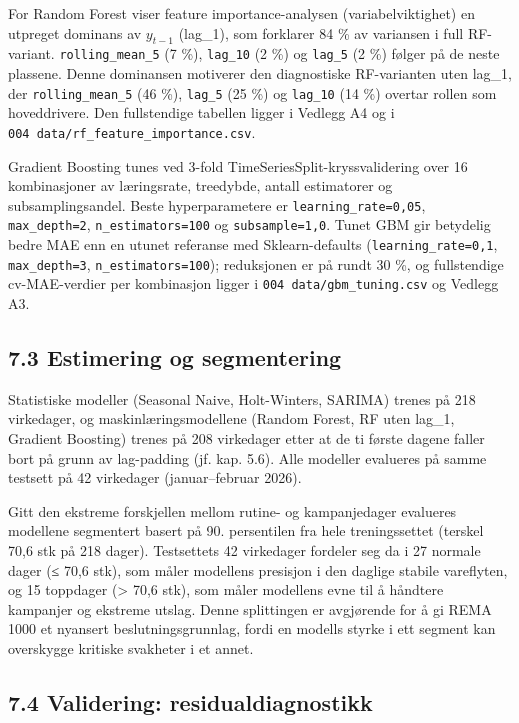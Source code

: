 \documentclass[
  norsk,
  11pt,
  a4paper,
]{article}
\begin{document}
For Random Forest viser feature importance-analysen (variabelviktighet)
en utpreget dominans av \(y_{t-1}\) (lag\_1), som forklarer 84 \% av
variansen i full RF-variant. \texttt{rolling\_mean\_5} (7 \%),
\texttt{lag\_10} (2 \%) og \texttt{lag\_5} (2 \%) følger på de neste
plassene. Denne dominansen motiverer den diagnostiske RF-varianten uten
lag\_1, der \texttt{rolling\_mean\_5} (46 \%), \texttt{lag\_5} (25 \%)
og \texttt{lag\_10} (14 \%) overtar rollen som hoveddrivere. Den
fullstendige tabellen ligger i Vedlegg A4 og i
\texttt{004\ data/rf\_feature\_importance.csv}.

Gradient Boosting tunes ved 3-fold TimeSeriesSplit-kryssvalidering over
16 kombinasjoner av læringsrate, treedybde, antall estimatorer og
subsamplingsandel. Beste hyperparametere er
\texttt{learning\_rate=0,05}, \texttt{max\_depth=2},
\texttt{n\_estimators=100} og \texttt{subsample=1,0}. Tunet GBM gir
betydelig bedre MAE enn en utunet referanse med Sklearn-defaults
(\texttt{learning\_rate=0,1}, \texttt{max\_depth=3},
\texttt{n\_estimators=100}); reduksjonen er på rundt 30 \%, og
fullstendige cv-MAE-verdier per kombinasjon ligger i
\texttt{004\ data/gbm\_tuning.csv} og Vedlegg A3.

\subsection{7.3 Estimering og
segmentering}\label{estimering-og-segmentering}

Statistiske modeller (Seasonal Naive, Holt-Winters, SARIMA) trenes på
218 virkedager, og maskinlæringsmodellene (Random Forest, RF uten
lag\_1, Gradient Boosting) trenes på 208 virkedager etter at de ti
første dagene faller bort på grunn av lag-padding (jf. kap. 5.6). Alle
modeller evalueres på samme testsett på 42 virkedager (januar--februar
2026).

Gitt den ekstreme forskjellen mellom rutine- og kampanjedager evalueres
modellene segmentert basert på 90. persentilen fra hele treningssettet
(terskel 70,6 stk på 218 dager). Testsettets 42 virkedager fordeler seg
da i 27 normale dager (≤ 70,6 stk), som måler modellens presisjon i den
daglige stabile vareflyten, og 15 toppdager (\textgreater{} 70,6 stk),
som måler modellens evne til å håndtere kampanjer og ekstreme utslag.
Denne splittingen er avgjørende for å gi REMA 1000 et nyansert
beslutningsgrunnlag, fordi en modells styrke i ett segment kan
overskygge kritiske svakheter i et annet.

\subsection{7.4 Validering:
residualdiagnostikk}\label{validering-residualdiagnostikk}
\end{document}
